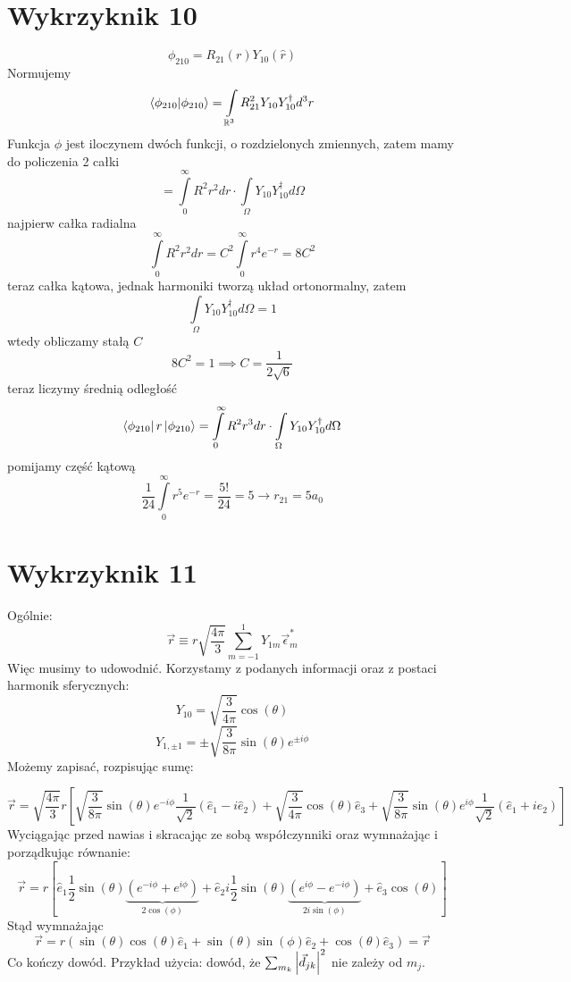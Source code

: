 \documentclass[a4paper,12pt]{article}
\begin{document}
\section{Wykrzyknik 10}
$$
	\phi_{210} = R_{21}(r) Y_{10}(\hat{r})
$$
Normujemy
$$
	\braket{\phi_{210}}{\phi_{210}} = \int\limits_{\mathbb{R}^3} R_{21}^2 Y_{10} Y_{10}^\dagger d^3r
$$
Funkcja $\phi$ jest iloczynem dwóch funkcji, o rozdzielonych zmiennych, zatem mamy do policzenia 2 całki
$$
	= \int\limits_0^{\infty}R^2 r^2 dr \cdot \int\limits_{\Omega} Y_{10} Y_{10}^\dagger d\Omega
$$
najpierw całka radialna
$$
	\int\limits_0^{\infty}R^2 r^2 dr  = C^2\int\limits_0^{\infty}r^4 e^{-r} = 8C^2
$$
teraz całka kątowa, jednak harmoniki tworzą układ ortonormalny, zatem
$$
	\int\limits_{\Omega} Y_{10} Y_{10}^\dagger d\Omega = 1
$$
wtedy obliczamy stałą $C$
$$
	8C^2 = 1 \implies C= \frac{1}{2\sqrt{6}}
$$
teraz liczymy średnią odległość
$$
	\bra{\phi_{210}}r\ket{\phi_{210}} = \int\limits_0^{\infty}R^2 r^3 dr \cdot \int\limits_{\Omega} Y_{10} Y_{10}^\dagger d\Omega
$$
pomijamy część kątową
$$
	\frac{1}{24}\int\limits_0^{\infty}r^5 e^{-r} = \frac{5!}{24} = 5 \to r_{21} = 5a_0
$$

\section{Wykrzyknik 11}
Ogólnie:
\[
  \vec{r} \equiv  r \sqrt{\frac{4\pi}{3}}\sum_{m=-1}^{1} Y_{1m}
  \vec{\epsilon}_m^*
\]
Więc musimy to udowodnić. Korzystamy z podanych informacji oraz z postaci
harmonik sferycznych:
\[
  Y_{10} = \sqrt{\frac{3}{4\pi}} \cos(\theta)
\]
\[
  Y_{1, \pm 1} = \pm \sqrt{\frac{3}{8\pi}} \sin(\theta) e^{\pm i \phi}
\]
Możemy zapisać, rozpisując sumę:

\begin{equation*}
    \vec{r}  = \sqrt{\frac{4\pi}{3}} r \left[
    \sqrt{\frac{3}{8\pi}}\sin(\theta)e^{-i\phi}\frac{1}{\sqrt{2}} \left(
    \hat{e}_1 - i\hat{e}_2 \right) + \sqrt{\frac{3}{4\pi}}\cos(\theta)\hat{e}_3 +
    \sqrt{\frac{3}{8\pi}}\sin(\theta)e^{i\phi} \frac{1}{\sqrt{2}}\left(\hat{e}_1 +
  i\hat{e}_2 \right) \right]
\end{equation*}
Wyciągając przed nawias i skracając ze sobą współczynniki  oraz wymnażając i
porządkując równanie:
\begin{equation*}
  \vec{r} = r \left[ \hat{e}_1 \frac{1}{2} \sin(\theta) \underbrace{\left( e^{-i\phi} +
    e^{i\phi} \right)}_{2\cos(\phi)} + \hat{e}_2 i \frac{1}{2}\sin(\theta)
    \underbrace{\left( e^{i\phi} - e^{-i\phi} \right)}_{2i\sin(\phi)} +
  \hat{e}_3 \cos(\theta)\right]
\end{equation*}
Stąd wymnażając
\begin{equation*}
  \vec{r} = r\left( \sin(\theta) \cos(\theta) \hat{e}_1 + \sin(\theta)
  \sin(\phi) \hat{e}_2 + \cos(\theta) \hat{e}_3 \right) = \vec{r}
\end{equation*}
Co kończy dowód. Przykład użycia: dowód, że $\sum_{m_k} \abs{\vec{d}_{jk}}^2$ nie
zależy od $m_j$.
\end{document}
